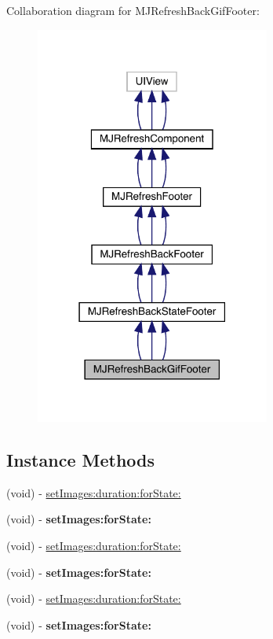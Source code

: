 Collaboration diagram for M\+J\+Refresh\+Back\+Gif\+Footer\+:\nopagebreak
\begin{figure}[H]
\begin{center}
\leavevmode
\includegraphics[width=219pt]{interface_m_j_refresh_back_gif_footer__coll__graph}
\end{center}
\end{figure}
\subsection*{Instance Methods}
\begin{DoxyCompactItemize}
\item 
(void) -\/ \mbox{\hyperlink{interface_m_j_refresh_back_gif_footer_a77591768ea89ec5a912b0ca6c1c4dab8}{set\+Images\+:duration\+:for\+State\+:}}
\item 
\mbox{\label{interface_m_j_refresh_back_gif_footer_ab0e22f550b8a4ee556b85bc80176f149}} 
(void) -\/ {\bfseries set\+Images\+:for\+State\+:}
\item 
(void) -\/ \mbox{\hyperlink{interface_m_j_refresh_back_gif_footer_a77591768ea89ec5a912b0ca6c1c4dab8}{set\+Images\+:duration\+:for\+State\+:}}
\item 
\mbox{\label{interface_m_j_refresh_back_gif_footer_ab0e22f550b8a4ee556b85bc80176f149}} 
(void) -\/ {\bfseries set\+Images\+:for\+State\+:}
\item 
(void) -\/ \mbox{\hyperlink{interface_m_j_refresh_back_gif_footer_a77591768ea89ec5a912b0ca6c1c4dab8}{set\+Images\+:duration\+:for\+State\+:}}
\item 
\mbox{\label{interface_m_j_refresh_back_gif_footer_ab0e22f550b8a4ee556b85bc80176f149}} 
(void) -\/ {\bfseries set\+Images\+:for\+State\+:}
\end{DoxyCompactItemize}
